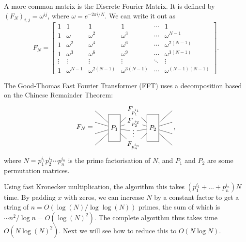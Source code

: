 A more common matrix is the Discrete Fourier Matrix.
It is defined by $(F_N)_{i,j}=\omega^{ij}$, 
where $\omega = e^{-2\pi i/N}$.
We can write it out as 
\[
F_N =  \begin{bmatrix}
1&1&1&1&\cdots &1 \\
1&\omega&\omega^2&\omega^3&\cdots&\omega^{N-1} \\
1&\omega^2&\omega^4&\omega^6&\cdots&\omega^{2(N-1)}\\ 1&\omega^3&\omega^6&\omega^9&\cdots&\omega^{3(N-1)}\\
\vdots&\vdots&\vdots&\vdots&\ddots&\vdots\\
1&\omega^{N-1}&\omega^{2(N-1)}&\omega^{3(N-1)}&\cdots&\omega^{(N-1)(N-1)}
\end{bmatrix}
.
\]

The Good-Thomas Fast Fourier Transformer (FFT) uses a decomposition based on the Chinese Remainder Theorem:
\[
F_{N} = 
   \begin{tikzpicture}[baseline=-1em, y=1.7em]
      \node[rectangle, draw, minimum height=4em] (P1) at (0,-.5) {$P_1$};
      \node (A) at (1,1) {$F_{p_1^{i_1}}$};
      \node[rectangle, draw, minimum height=4em] (P2) at (2,-.5) {$P_2$};
      \node (B) at (1,0) {$F_{p_2^{i_2}}$};
      \node (C) at (1,-.8) {$\vdots$};
      \node (D) at (1,-2) {$F_{p_n^{i_n}}$};
      \draw (-1,1) -- (P1) -- (A) -- (P2) -- (3, 1);
      \draw (-1,0) -- (P1) -- (B) -- (P2) -- (3, 0);
      \draw (-1,-1) -- (P1) -- (C) -- (P2) -- (3, -1);
      \draw (-1,-2) -- (P1) -- (D) -- (P2) -- (3, -2);
   \end{tikzpicture}
   \,,
\]
where $N = p_1^{i_1} p_2^{i_2} \cdots p_n^{i_n}$ is the prime factorisation of $N$, and $P_1$ and $P_2$ are some permutation matrices.

Using fast Kronecker multiplication, the algorithm this takes $(p_1^{i_1}+\dots+p_n^{i_n}) N$ time.
By padding $x$ with zeros, we can increase $N$ by a constant factor to get a string of $n=O(\log(N)/\log\log(N))$ primes, the sum of which is $\sim n^2/\log n = O(\log(N)^2)$.
The complete algorithm thus takes time $O(N \log(N)^2)$.
Next we will see how to reduce this to $O(N\log N)$.

